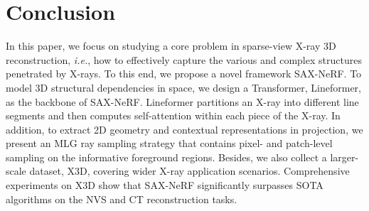 \documentclass[10pt,twocolumn,letterpaper]{article}
\begin{document}
\vspace{-2.5mm}
\section{Conclusion}
\vspace{-0.5mm}
\label{sec:conclusion}
In this paper, we focus on studying a core problem in sparse-view X-ray 3D reconstruction, \emph{i.e.}, how to effectively capture the various and complex structures penetrated by X-rays. To this end, we propose a novel framework SAX-NeRF. To model 3D structural dependencies in space, we design a Transformer, Lineformer, as the backbone of SAX-NeRF. Lineformer partitions an X-ray into different line segments and then computes self-attention within each piece of the X-ray. In addition, to extract 2D geometry and contextual representations in projection, we present an MLG ray sampling strategy that contains pixel- and patch-level sampling on the informative foreground regions. Besides, we also collect a larger-scale dataset, X3D, covering wider X-ray application scenarios. Comprehensive experiments on X3D show that SAX-NeRF significantly surpasses SOTA algorithms on the NVS and CT reconstruction tasks.


{
	\small
	
	
}
\end{document}
